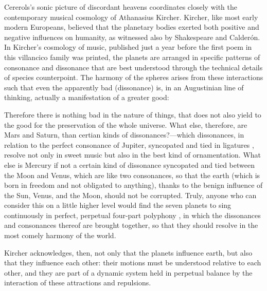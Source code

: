 Cererols's sonic picture of discordant heavens coordinates closely with the
contemporary musical cosmology of Athanasius Kircher.
Kircher, like most early modern Europeans, believed that the planetary bodies
exerted both positive and negative influences on humanity, as witnessed also by
Shakespeare and Calderón.
In Kircher's cosmology of music, published just a year before the first poem in
this villancico family was printed, the planets are arranged in specific
patterns of consonance and dissonance that are best understood through the
technical details of species counterpoint.%
The harmony of the spheres arises from these interactions such that even the
apparently bad (dissonance) is, in an Augustinian line of thinking, actually a
manifestation of a greater good:
\begin{quoting}
	Therefore there is nothing bad in the nature of things, that does not
	also yield to the good for the preservation of the whole universe.
	What else, therefore, are Mars and Saturn, than certian kinds of
        dissonances?---which dissonances, in relation to the perfect consonance
        of Jupiter, syncopated and tied in ligatures , resolve
        not only in sweet music but also in the best kind of ornamentation.
	What else is Mercury if not a certain kind of dissonance syncopated and
	tied between the Moon and Venus, which are like two consonances, so that
	the earth (which is born in freedom and not obligated to anything),
	thanks to the benign influence of the Sun, Venus, and the Moon, should
	not be corrupted.
	Truly, anyone who can consider this on a little higher level would find
	the seven planets to sing continuously in perfect, perpetual four-part
	polyphony , in which the dissonances and
	consonances thereof are brought together, so that they should resolve in
	the most comely harmony of the world.%
        \Autocite[bk. 2, 383--384]{Kircher:Musurgia}
\end{quoting}
Kircher acknowledges, then, not only that the planets influence earth, but also
that they influence each other: their motions must be understood relative to
each other, and they are part of a dynamic system held in perpetual balance by
the interaction of these attractions and repulsions.

